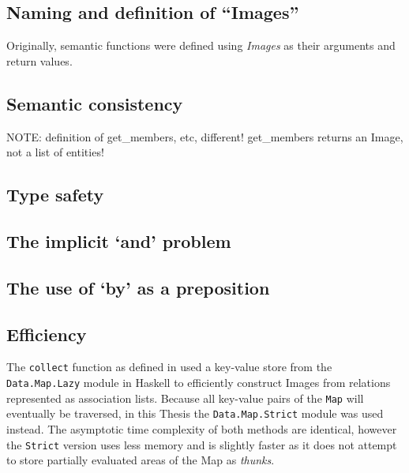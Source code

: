 \documentclass[../main.tex]{subfiles}
\begin{document}
\subsection{Naming and definition of ``Images''}

Originally, semantic functions were defined using {\em Images} as their arguments and return values.

\subsection{Semantic consistency}

NOTE: definition of get\_members, etc, different! get\_members returns an Image, not a list of entities!

\subsection{Type safety}

\subsection{The implicit `and' problem}

\subsection{The use of `by' as a preposition}

\subsection{Efficiency}

The \texttt{collect} function as defined in \cite{agboola2015extensible} used a key-value store from the \texttt{Data.Map.Lazy} module in Haskell to efficiently construct Images from relations represented as association lists.  Because all key-value pairs of the \texttt{Map} will eventually be traversed, in this Thesis the \texttt{Data.Map.Strict} module was used instead.  The asymptotic time complexity of both methods are identical, however the \texttt{Strict} version uses less memory and is slightly faster as it does not attempt to store partially evaluated areas of the Map as {\em thunks}.


\end{document}
